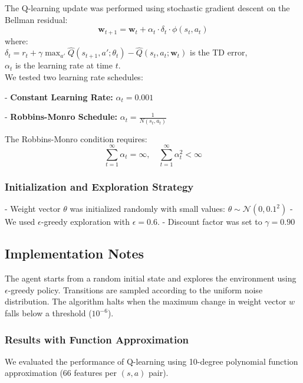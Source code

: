 \documentclass[10pt,twocolumn,letterpaper]{article}
\begin{document}
The Q-learning update was performed using stochastic gradient descent on the Bellman residual:
$$
\boldsymbol{w}_{t+1} = \boldsymbol{w}_t + \alpha_t \cdot \delta_t \cdot \phi(s_t, a_t)
$$
where:
\\
$\delta_t = r_t + \gamma \max_{a'} \hat{Q}(s_{t+1}, a'; \theta_t) - \hat{Q}(s_t, a_t; \boldsymbol{w}_t)$ is the TD error,
\\
$\alpha_t$ is the learning rate at time $t$.
\\
We tested two learning rate schedules:

    
- \textbf{Constant Learning Rate:} $\alpha_t = 0.001$
    
- \textbf{Robbins-Monro Schedule:} $\alpha_t = \frac{1}{N(s_t, a_t)}$


The Robbins-Monro condition requires:
$$
\sum_{t=1}^\infty \alpha_t = \infty, \quad \sum_{t=1}^\infty \alpha_t^2 < \infty
$$

\subsubsection*{Initialization and Exploration Strategy}

- Weight vector $\theta$ was initialized randomly with small values: $\theta \sim \mathcal{N}(0, 0.1^2)$
- We used $\epsilon$-greedy exploration with $\epsilon = 0.6$.
- Discount factor was set to $\gamma = 0.90$

\subsection*{Implementation Notes}
The agent starts from a random initial state and explores the environment using $\epsilon$-greedy policy. Transitions are sampled according to the uniform noise distribution. The algorithm halts when the maximum change in weight vector $w$ falls below a threshold ($10^{-6}$).

\subsubsection*{Results with Function Approximation}

We evaluated the performance of Q-learning using 10-degree polynomial function approximation (66 features per $(s,a)$ pair).
\end{document}
